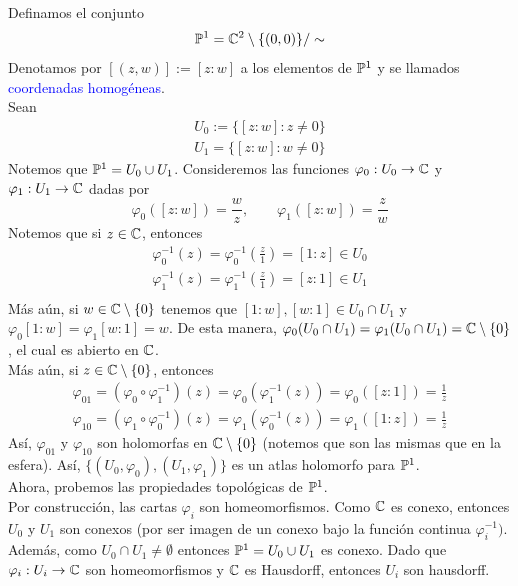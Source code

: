 \begin{example}
\begin{itemize}
	\end{itemize}
	Definamos el conjunto 
	\begin{equation*}
		\mathbb{P}^1=\mathbb{C}^2\setminus\{(0,0)\}/\sim
	\end{equation*}
	Denotamos por $[(z,w)]:=[z:w]$ a los elementos de $\mathbb{P}^1$ y se llamados \textcolor{blue}{coordenadas homogéneas}.\\
	Sean 
	\begin{align*}
		U_0:=\{[z:w]:z\neq 0\} \\
		U_1=\{[z:w]:w\neq 0\} 
	\end{align*}
	Notemos que $\mathbb{P}^1=U_0\cup U_1$. 
	Consideremos las funciones $\varphi_0:U_0\to\mathbb{C}$ y $\varphi_1:U_1\to\mathbb{C}$ dadas por
	\begin{equation*}
		\varphi_0([z:w])=\frac{w}{z},\qquad \varphi_1([z:w])=\frac{z}{w}
	\end{equation*}
	Notemos que si $z\in\mathbb{C}$, entonces
	\begin{align*}
		\varphi_0^{-1}(z)= \varphi_0^{-1}\left(\frac{z}{1}\right)=[1:z]\in U_0\\
		\varphi_1^{-1}(z)= \varphi_1^{-1}\left(\frac{z}{1}\right)=[z:1]\in U_1\\
	\end{align*}
	Más aún, si $w\in\mathbb{C}\setminus\{0\}$ tenemos que $[1:w],[w:1]\in U_0\cap U_1$ y $\varphi_0[1:w]=\varphi_1[w:1]=w$. De esta manera, $\varphi_0(U_0\cap U_1)=\varphi_1(U_0\cap U_1)=\mathbb{C}\setminus\{0\}$, el cual es abierto en $\mathbb{C}$.\\
	Más aún, si $z\in\mathbb{C}\setminus\{0\}$, entonces
	\begin{align*}
		\varphi_{01}=(\varphi_0\circ\varphi_1^{-1})(z)=\varphi_0(\varphi_1^{-1}(z))=\varphi_0([z:1])=\frac{1}{z}\\
		\varphi_{10}=(\varphi_1\circ\varphi_0^{-1})(z)=\varphi_1(\varphi_0^{-1}(z))=\varphi_1([1:z])=\frac{1}{z}
	\end{align*}
	Así, $\varphi_{01}$ y $\varphi_{10}$ son holomorfas en $\mathbb{C}\setminus\{0\}$ (notemos que son las mismas que en la esfera). Así, $\{(U_0,\varphi_0),(U_1,\varphi_1)\}$ es un atlas holomorfo para $\mathbb{P}^1$.\\
	Ahora, probemos las propiedades topológicas de $\mathbb{P}^1$.\\
	Por construcción, las cartas $\varphi_i$ son homeomorfismos. Como $\mathbb{C}$ es conexo, entonces $U_0$ y $U_1$ son conexos (por ser imagen de un conexo bajo la función continua $\varphi_i^{-1})$. Además, como $U_0\cap U_1\neq\emptyset$ entonces $\mathbb{P}^1=U_0\cup U_1$ es conexo. Dado que $\varphi_i:U_i\to\mathbb{C}$ son homeomorfismos y $\mathbb{C}$ es Hausdorff, entonces $U_i$ son hausdorff.\\

\end{example}
